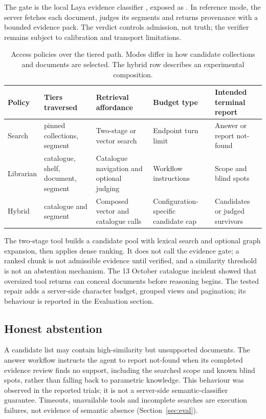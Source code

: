 The gate is the local Laya evidence classifier \cite{laya}, exposed as
. In reference mode, the server fetches each document,
judges its segments and returns provenance with a bounded evidence pack. The
verdict controls admission, not truth; the verifier remains subject to
calibration and transport limitations.

\begin{table}[t]
\centering
\small
\setlength{\tabcolsep}{5pt}
\caption{Access policies over the tiered path. Modes differ in how candidate collections and documents are selected.
The hybrid row describes an experimental composition.}
\label{tab:lanes}
\begin{tabular}{@{}>{\raggedright\arraybackslash}p{}>{\raggedright\arraybackslash}p{}>{\raggedright\arraybackslash}p{}>{\raggedright\arraybackslash}p{}>{\raggedright\arraybackslash}p{}@{}}
\toprule
Policy & Tiers traversed & Retrieval affordance & Budget type & Intended terminal report\\
\midrule
Search & pinned collections, segment & Two-stage or vector search & Endpoint turn limit & Answer or report not-found\\
Librarian & catalogue, shelf, document, segment & Catalogue navigation and optional judging & Workflow instructions & Scope and blind spots\\
Hybrid & catalogue and segment & Composed vector and catalogue calls & Configuration-specific candidate cap & Candidates or judged survivors\\
\bottomrule
\end{tabular}
\end{table}

The two-stage tool builds a candidate pool with lexical search and optional
graph expansion, then applies dense ranking. It does not call the
evidence gate; a ranked chunk is not admissible evidence until verified, and a
similarity threshold is not an abstention mechanism. The 13 October catalogue
incident showed that oversized tool returns can conceal documents before
reasoning begins. The tested repair adds a server-side character budget,
grouped views and pagination; its behaviour is reported in the Evaluation
section.

\subsection{Honest abstention}
A candidate list may contain high-similarity but unsupported documents. The
answer workflow instructs the agent to report not-found when its completed
evidence review finds no support, including the searched scope and known blind
spots, rather than falling back to parametric knowledge. This behaviour was
observed in the reported trials; it is not a server-side semantic-classifier
guarantee. Timeouts, unavailable tools and incomplete searches are execution
failures, not evidence of semantic absence (Section~\ref{sec:eval}).
